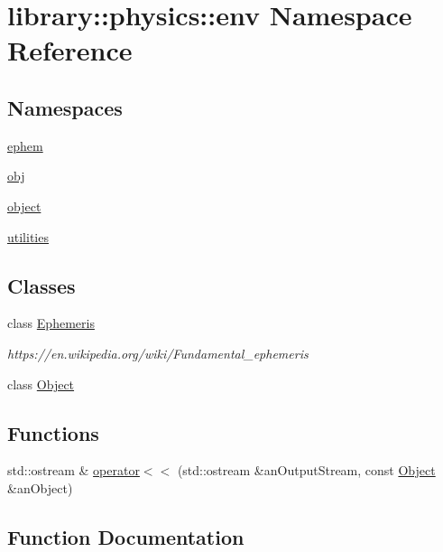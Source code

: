 \hypertarget{namespacelibrary_1_1physics_1_1env}{}\section{library\+:\+:physics\+:\+:env Namespace Reference}
\label{namespacelibrary_1_1physics_1_1env}
\subsection*{Namespaces}
\begin{DoxyCompactItemize}
\item 
 \hyperlink{namespacelibrary_1_1physics_1_1env_1_1ephem}{ephem}
\item 
 \hyperlink{namespacelibrary_1_1physics_1_1env_1_1obj}{obj}
\item 
 \hyperlink{namespacelibrary_1_1physics_1_1env_1_1object}{object}
\item 
 \hyperlink{namespacelibrary_1_1physics_1_1env_1_1utilities}{utilities}
\end{DoxyCompactItemize}
\subsection*{Classes}
\begin{DoxyCompactItemize}
\item 
class \hyperlink{classlibrary_1_1physics_1_1env_1_1_ephemeris}{Ephemeris}
\begin{DoxyCompactList}\small\item\em https\+://en.wikipedia.\+org/wiki/\+Fundamental\+\_\+ephemeris \end{DoxyCompactList}\item 
class \hyperlink{classlibrary_1_1physics_1_1env_1_1_object}{Object}
\end{DoxyCompactItemize}
\subsection*{Functions}
\begin{DoxyCompactItemize}
\item 
std\+::ostream \& \hyperlink{namespacelibrary_1_1physics_1_1env_ac884c1af7d9475081d42a05bdd59ac3a}{operator$<$$<$} (std\+::ostream \&an\+Output\+Stream, const \hyperlink{classlibrary_1_1physics_1_1env_1_1_object}{Object} \&an\+Object)
\end{DoxyCompactItemize}


\subsection{Function Documentation}
\mbox{\label{namespacelibrary_1_1physics_1_1env_ac884c1af7d9475081d42a05bdd59ac3a}} 
